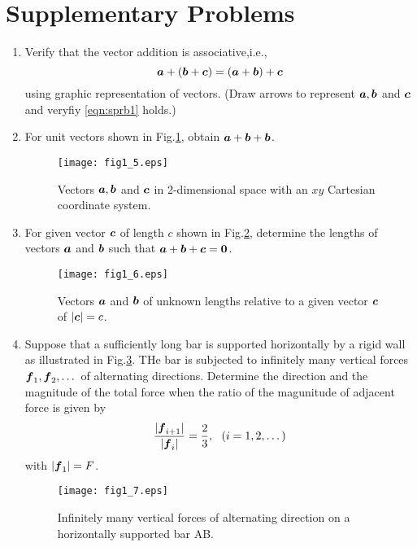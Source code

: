 \documentclass[10pt,a4j]{article}
\begin{document}
\section{Supplementary Problems}
\begin{enumerate}
\item
	Verify that the vector addition is associative,i.e., 
	\begin{equation}
		\mbox{\boldmath $a$}+(\mbox{\boldmath $b$}+\mbox{\boldmath $c$})= (\mbox{\boldmath $a$}+\mbox{\boldmath $b$})+\mbox{\boldmath $c$}
	\label{eqn:sprb1}
	\end{equation}
	using graphic representation of vectors. 
	(Draw arrows to represent $\mbox{\boldmath $a$},\mbox{\boldmath $b$}$ and $\mbox{\boldmath $c$}$ and veryfiy \ref{eqn:sprb1} holds.)
\item
	For unit vectors shown in Fig.\ref{fig:fig1_5}, obtain $\mbox{\boldmath $a$}+\mbox{\boldmath $b$}+\mbox{\boldmath $b$}$.  
	\begin{figure}[h]
	\begin{center}
	\texttt{[image: fig1\_5.eps]} 
	\end{center}
	\caption{Vectors $\mbox{\boldmath $a$}, \mbox{\boldmath $b$}$ and $\mbox{\boldmath $c$}$ in 2-dimensional space with an
	$xy$ Cartesian coordinate system.}
	\label{fig:fig1_5}
	\end{figure}
\item
	For given vector $\mbox{\boldmath $c$}$ of length $c$ shown in Fig.\ref{fig:fig1_6}, determine the lengths of vectors 
	$\mbox{\boldmath $a$}$ and $\mbox{\boldmath $b$}$ such that $\mbox{\boldmath $a$}+\mbox{\boldmath $b$}+\mbox{\boldmath $c$}=\mbox{\boldmath $0$}$.
	\begin{figure}[h]
	\begin{center}
	\texttt{[image: fig1\_6.eps]} 
	\end{center}
		\caption{
			Vectors $\mbox{\boldmath $a$}$ and $\mbox{\boldmath $b$}$ of unknown lengths relative to 
			a given vector $\mbox{\boldmath $c$}$ of $|\mbox{\boldmath $c$}|=c$.} 
	\label{fig:fig1_6}
	\end{figure}
\item
	Suppose that a sufficiently long bar is supported horizontally by a rigid wall as 
	illustrated in Fig.\ref{fig:fig1_7}. THe bar is subjected to 
	infinitely many vertical forces $\mbox{\boldmath $f$}_1,\mbox{\boldmath $f$}_2,\dots $ of alternating 
	directions. Determine the direction and the magnitude of the total force 
	when the ratio of the magunitude of adjacent force is given by
	\begin{equation}
		\frac{| \mbox{\boldmath $f$}_{i+1}|}{|\mbox{\boldmath $f$}_i|}=\frac{2}{3}, \ \ (i=1,2,\dots)
		\label{eqn:}
	\end{equation}
	with $|\mbox{\boldmath $f$}_1|=F$.
	\begin{figure}[h]
	\begin{center}
	\texttt{[image: fig1\_7.eps]} 
	\end{center}
	\caption{Infinitely many vertical forces of alternating direction on 
	a horizontally supported bar AB.}
	\label{fig:fig1_7}
	\end{figure}
\end{enumerate}
\end{document}

